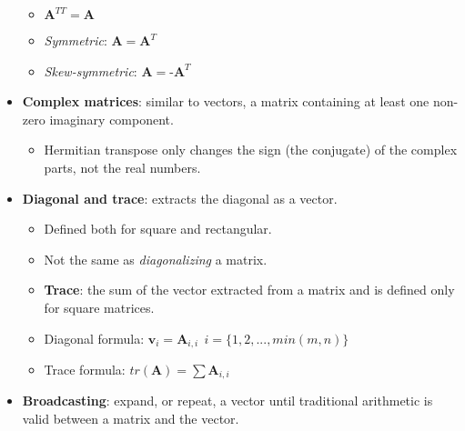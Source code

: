 \documentclass[12pt,a4paper]{article}
\begin{document}
\begin{itemize}
\begin{itemize}
            \item \(\textbf{A}^{TT} = \textbf{A}\)
            \item \textit{Symmetric}: \(\textbf{A} = \textbf{A}^T\)
            \item \textit{Skew-symmetric}: \(\textbf{A} = \textbf{-A}^T\)
        \end{itemize}
    \item \textbf{Complex matrices}: similar to vectors, a matrix containing at least one non-zero imaginary component.
        \begin{itemize}
            \item Hermitian transpose only changes the sign (the conjugate) of the complex parts, not the real numbers.
        \end{itemize}
    \item \textbf{Diagonal and trace}: extracts the diagonal as a vector.
        \begin{itemize}
            \item Defined both for square and rectangular.
            \item Not the same as \textit{diagonalizing} a matrix.
            \item \textbf{Trace}: the sum of the vector extracted from a matrix and is defined only for square matrices.
            \item Diagonal formula: {\color{o-Sun}\(\textbf{v}_i = \textbf{A}_{i,i}~~ i = \{1,2,...,min(m,n)\}\)}
            \item Trace formula: {\color{o-Sun}\(tr(\textbf{A})= \sum \textbf{A}_{i, i}\)}
        \end{itemize}
    \item \textbf{Broadcasting}: expand, or repeat, a vector until traditional arithmetic is valid between a matrix and the vector.
\end{itemize}

\end{document}
